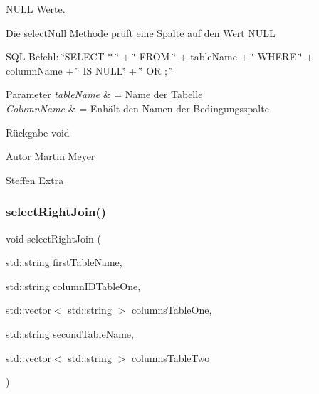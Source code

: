 N\+U\+LL Werte. 

Die select\+Null Methode prüft eine Spalte auf den Wert N\+U\+LL

S\+Q\+L-\/\+Befehl\+: \char`\"{}\+S\+E\+L\+E\+C\+T $\ast$ \char`\"{} + \char`\"{} F\+R\+O\+M \char`\"{} + table\+Name + \char`\"{} W\+H\+E\+R\+E \char`\"{} + column\+Name + \char`\"{} I\+S N\+U\+L\+L\char`\"{} + \char`\"{} O\+R \textquotesingle{} \textquotesingle{}; \char`\"{}


\begin{DoxyParams}{Parameter}
{\em table\+Name} & = Name der Tabelle \\
\hline
{\em Column\+Name} & = Enhält den Namen der Bedingungsspalte\\
\hline
\end{DoxyParams}
\begin{DoxyReturn}{Rückgabe}
void
\end{DoxyReturn}
\begin{DoxyAuthor}{Autor}
Martin Meyer 

Steffen Extra 
\end{DoxyAuthor}
\mbox{\label{selection_request_8hpp_aff2cca0ae3f40a8b3ec70e85702bb8fc}} 
\subsubsection{select\+Right\+Join()}
{\footnotesize\ttfamily void select\+Right\+Join (\begin{DoxyParamCaption}\item[{std\+::string}]{first\+Table\+Name,  }\item[{std\+::string}]{column\+I\+D\+Table\+One,  }\item[{std\+::vector$<$ std\+::string $>$}]{columns\+Table\+One,  }\item[{std\+::string}]{second\+Table\+Name,  }\item[{std\+::vector$<$ std\+::string $>$}]{columns\+Table\+Two }\end{DoxyParamCaption})}

